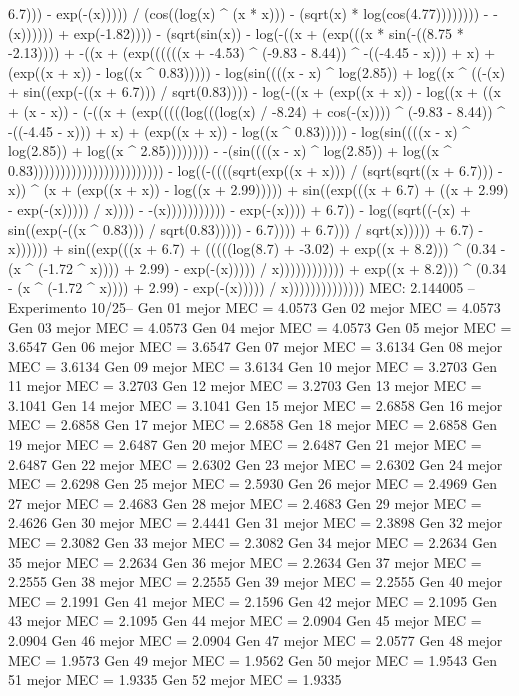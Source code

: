 6.7))) - exp(-(x))))) / (cos((log(x) ^ (x * x))) - (sqrt(x) * log(cos(4.77)))))))) - -(x)))))) + exp(-1.82)))) - (sqrt(sin(x)) - log(-((x + (exp(((x * sin(-((8.75 * -2.13)))) + -((x + (exp((((((x + -4.53) ^ (-9.83 - 8.44)) ^ -((-4.45 - x))) + x) + (exp((x + x)) - log((x ^ 0.83))))) - log(sin((((x - x) ^ log(2.85)) + log((x ^ ((-(x) + sin((exp(-((x + 6.7))) / sqrt(0.83)))) - log(-((x + (exp((x + x)) - log((x + ((x + (x - x)) - (-((x + (exp(((((log(((log(x) / -8.24) + cos(-(x)))) ^ (-9.83 - 8.44)) ^ -((-4.45 - x))) + x) + (exp((x + x)) - log((x ^ 0.83))))) - log(sin((((x - x) ^ log(2.85)) + log((x ^ 2.85)))))))) - -(sin((((x - x) ^ log(2.85)) + log((x ^ 0.83)))))))))))))))))))))))) - log((-((((sqrt(exp((x + x))) / (sqrt(sqrt((x + 6.7))) - x)) ^ (x + (exp((x + x)) - log((x + 2.99))))) + sin((exp(((x + 6.7) + ((x + 2.99) - exp(-(x))))) / x)))) - -(x))))))))))) - exp(-(x)))) + 6.7)) - log((sqrt((-(x) + sin((exp(-((x ^ 0.83))) / sqrt(0.83))))) - 6.7)))) + 6.7))) / sqrt(x))))) + 6.7) - x)))))) + sin((exp(((x + 6.7) + (((((log(8.7) + -3.02) + exp((x + 8.2))) ^ (0.34 - (x ^ (-1.72 ^ x)))) + 2.99) - exp(-(x))))) / x)))))))))))) + exp((x + 8.2))) ^ (0.34 - (x ^ (-1.72 ^ x)))) + 2.99) - exp(-(x))))) / x))))))))))))))
MEC: 2.144005
--Experimento 
 10/25--
Gen 01 mejor MEC = 4.0573
Gen 02 mejor MEC = 4.0573
Gen 03 mejor MEC = 4.0573
Gen 04 mejor MEC = 4.0573
Gen 05 mejor MEC = 3.6547
Gen 06 mejor MEC = 3.6547
Gen 07 mejor MEC = 3.6134
Gen 08 mejor MEC = 3.6134
Gen 09 mejor MEC = 3.6134
Gen 10 mejor MEC = 3.2703
Gen 11 mejor MEC = 3.2703
Gen 12 mejor MEC = 3.2703
Gen 13 mejor MEC = 3.1041
Gen 14 mejor MEC = 3.1041
Gen 15 mejor MEC = 2.6858
Gen 16 mejor MEC = 2.6858
Gen 17 mejor MEC = 2.6858
Gen 18 mejor MEC = 2.6858
Gen 19 mejor MEC = 2.6487
Gen 20 mejor MEC = 2.6487
Gen 21 mejor MEC = 2.6487
Gen 22 mejor MEC = 2.6302
Gen 23 mejor MEC = 2.6302
Gen 24 mejor MEC = 2.6298
Gen 25 mejor MEC = 2.5930
Gen 26 mejor MEC = 2.4969
Gen 27 mejor MEC = 2.4683
Gen 28 mejor MEC = 2.4683
Gen 29 mejor MEC = 2.4626
Gen 30 mejor MEC = 2.4441
Gen 31 mejor MEC = 2.3898
Gen 32 mejor MEC = 2.3082
Gen 33 mejor MEC = 2.3082
Gen 34 mejor MEC = 2.2634
Gen 35 mejor MEC = 2.2634
Gen 36 mejor MEC = 2.2634
Gen 37 mejor MEC = 2.2555
Gen 38 mejor MEC = 2.2555
Gen 39 mejor MEC = 2.2555
Gen 40 mejor MEC = 2.1991
Gen 41 mejor MEC = 2.1596
Gen 42 mejor MEC = 2.1095
Gen 43 mejor MEC = 2.1095
Gen 44 mejor MEC = 2.0904
Gen 45 mejor MEC = 2.0904
Gen 46 mejor MEC = 2.0904
Gen 47 mejor MEC = 2.0577
Gen 48 mejor MEC = 1.9573
Gen 49 mejor MEC = 1.9562
Gen 50 mejor MEC = 1.9543
Gen 51 mejor MEC = 1.9335
Gen 52 mejor MEC = 1.9335
